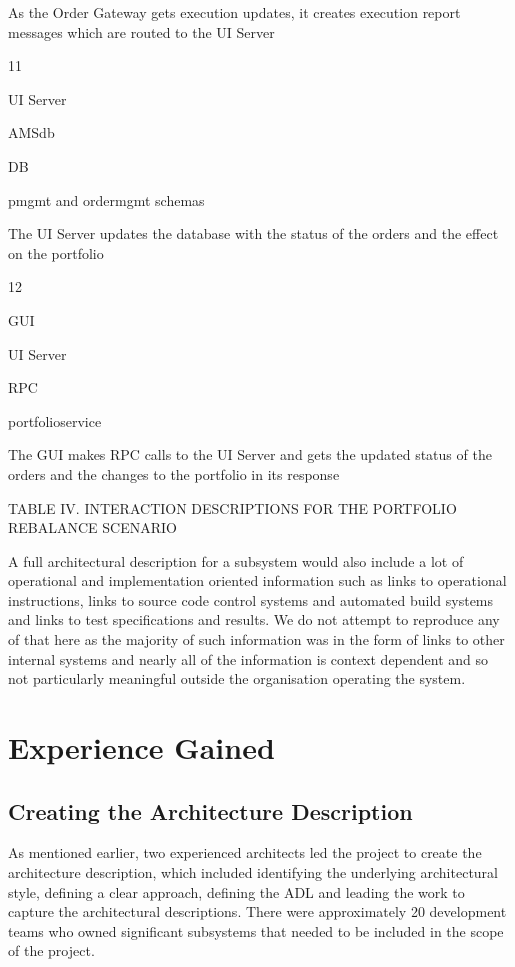 \begin{itemise}
As the Order Gateway gets execution updates, it creates execution report messages which are routed to the UI Server

11

UI Server

AMSdb

DB

pmgmt and ordermgmt schemas

The UI Server updates the database with the status of the orders and the effect on the portfolio

12

GUI

UI Server

RPC

portfolioservice

The GUI makes RPC calls to the UI Server and gets the updated status of the orders and the changes to the portfolio in its response

TABLE IV.  INTERACTION DESCRIPTIONS FOR THE PORTFOLIO REBALANCE SCENARIO

  A full architectural description for a subsystem would also include a lot of operational and implementation oriented information such as links to operational instructions, links to source code control systems and automated build systems and links to test specifications and results.  We do not attempt to reproduce any of that here as the majority of such information was in the form of links to other internal systems and nearly all of the information is context dependent and so not particularly meaningful outside the organisation operating the system.

\section{Experience Gained}

\subsection{Creating the Architecture Description}

  As mentioned earlier, two experienced architects led the project to create the architecture description, which included identifying the underlying architectural style, defining a clear approach, defining the ADL and leading the work to capture the architectural descriptions.  There were approximately 20 development teams who owned significant subsystems that needed to be included in the scope of the project.


\end{itemise}
